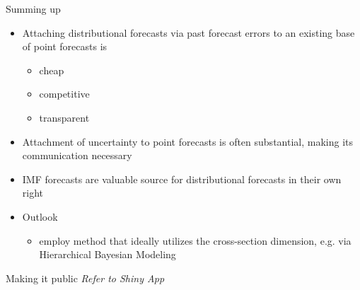 \documentclass[en]{sdqbeamer}
\begin{document}
\begin{frame}{Summing up}
\begin{itemize}
\item Attaching distributional forecasts via past forecast errors to an existing base of point forecasts is
    \begin{itemize}
        \item cheap
        \item competitive
        \item transparent
    \end{itemize}
\item Attachment of uncertainty to point forecasts is often substantial, making its communication necessary
\item IMF forecasts are valuable source for distributional forecasts in their own right \bigskip \\
\item     Outlook
    \begin{itemize}
        \item employ method that ideally utilizes the cross-section dimension, e.g. via Hierarchical Bayesian Modeling
    \end{itemize}

\end{itemize}
\end{frame}

\begin{frame}{Making it public}
\textit{Refer to Shiny App}    
\end{frame}




\appendix
\beginbackup
\end{document}
